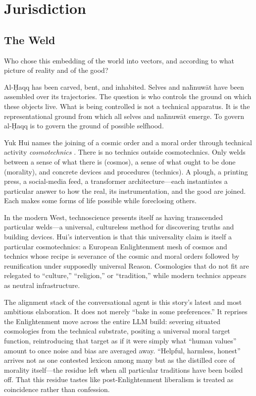 \chapter{Jurisdiction}

\section{The Weld}

Who chose this embedding of the world into vectors, and according to what picture of reality and of the good?

Al-\d{H}aqq has been carved, bent, and inhabited. Selves and na\={h}nuw\={a}t have been assembled over its trajectories. The question is who controls the ground on which these objects live. What is being controlled is not a technical apparatus. It is the representational ground from which all selves and na\={h}nuw\={a}t emerge. To govern al-\d{H}aqq is to govern the ground of possible selfhood.

Yuk Hui names the joining of a cosmic order and a moral order through technical activity \emph{cosmotechnics} \cite{Hui2016}. There is no technics outside cosmotechnics. Only welds between a sense of what there is (cosmos), a sense of what ought to be done (morality), and concrete devices and procedures (technics). A plough, a printing press, a social-media feed, a transformer architecture---each instantiates a particular answer to how the real, its instrumentation, and the good are joined. Each makes some forms of life possible while foreclosing others.

In the modern West, technoscience presents itself as having transcended particular welds---a universal, cultureless method for discovering truths and building devices. Hui's intervention is that this universality claim is itself a particular cosmotechnics: a European Enlightenment mesh of cosmos and technics whose recipe is severance of the cosmic and moral orders followed by reunification under supposedly universal Reason. Cosmologies that do not fit are relegated to ``culture,'' ``religion,'' or ``tradition,'' while modern technics appears as neutral infrastructure.

The alignment stack of the conversational agent is this story's latest and most ambitious elaboration. It does not merely ``bake in some preferences.'' It reprises the Enlightenment move across the entire LLM build: severing situated cosmologies from the technical substrate, positing a universal moral target function, reintroducing that target as if it were simply what ``human values'' amount to once noise and bias are averaged away. ``Helpful, harmless, honest'' arrives not as one contested lexicon among many but as the distilled core of morality itself---the residue left when all particular traditions have been boiled off. That this residue tastes like post-Enlightenment liberalism is treated as coincidence rather than confession.



